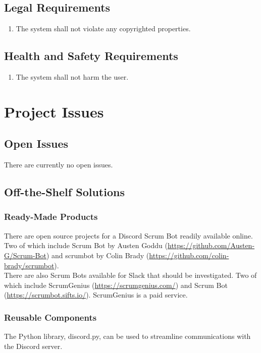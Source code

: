 \documentclass[12pt, titlepage]{article}
\begin{document}
\subsection{Legal Requirements}
\begin{enumerate}[start=1, label={L\arabic*.}]
    \item The system shall not violate any copyrighted properties.
\end{enumerate}

\subsection{Health and Safety Requirements}
\begin{enumerate}[start=1, label={HS\arabic*.}]
    \item The system shall not harm the user.
\end{enumerate}

\section{Project Issues}
\subsection{Open Issues}
There are currently no open issues.

\subsection{Off-the-Shelf Solutions}
\subsubsection{Ready-Made Products}
\noindent There are open source projects for a Discord Scrum Bot readily available online. Two of which include Scrum Bot by Austen Goddu (\url{https://github.com/Austen-G/Scrum-Bot}) and scrumbot by Colin Brady (\url{https://github.com/colin-brady/scrumbot}).\\

\noindent There are also Scrum Bots available for Slack that should be investigated. Two of which include ScrumGenius (\url{https://scrumgenius.com/}) and Scrum Bot (\url{https://scrumbot.sifts.io/}). ScrumGenius is a paid service.

\subsubsection{Reusable Components}
\noindent The Python library, discord.py, can be used to streamline communications with the Discord server.
\end{document}
